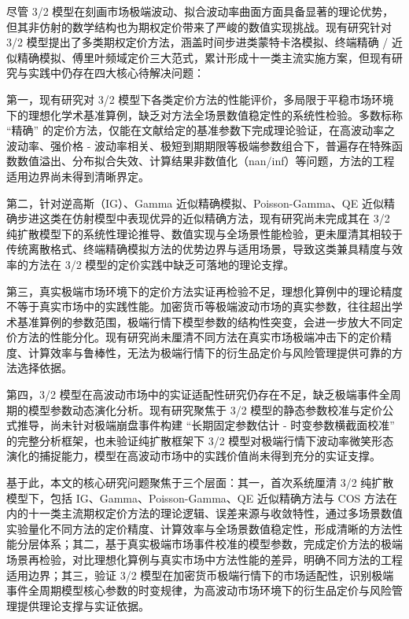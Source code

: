 尽管 3/2 模型在刻画市场极端波动、拟合波动率曲面方面具备显著的理论优势，但其非仿射的数学结构也为期权定价带来了严峻的数值实现挑战。现有研究针对 3/2 模型提出了多类期权定价方法，涵盖时间步进类蒙特卡洛模拟、终端精确 / 近似精确模拟、傅里叶频域定价三大范式，累计形成十一类主流实施方案，但现有研究与实践中仍存在四大核心待解决问题：

第一，现有研究对 3/2 模型下各类定价方法的性能评价，多局限于平稳市场环境下的理想化学术基准算例，缺乏对方法全场景数值稳定性的系统性检验。多数标称 “精确” 的定价方法，仅能在文献给定的基准参数下完成理论验证，在高波动率之波动率、强价格 - 波动率相关、极短到期期限等极端参数组合下，普遍存在特殊函数数值溢出、分布拟合失效、计算结果非数值化（nan/inf）等问题，方法的工程适用边界尚未得到清晰界定。

第二，针对逆高斯（IG）、Gamma 近似精确模拟、Poisson-Gamma、QE 近似精确步进这类在仿射模型中表现优异的近似精确方法，现有研究尚未完成其在 3/2 纯扩散模型下的系统性理论推导、数值实现与全场景性能检验，更未厘清其相较于传统离散格式、终端精确模拟方法的优势边界与适用场景，导致这类兼具精度与效率的方法在 3/2 模型的定价实践中缺乏可落地的理论支撑。

第三，真实极端市场环境下的定价方法实证再检验不足，理想化算例中的理论精度不等于真实市场中的实践性能。加密货币等极端波动市场的真实参数，往往超出学术基准算例的参数范围，极端行情下模型参数的结构性突变，会进一步放大不同定价方法的性能分化。现有研究尚未厘清不同方法在真实市场极端冲击下的定价精度、计算效率与鲁棒性，无法为极端行情下的衍生品定价与风险管理提供可靠的方法选择依据。

第四，3/2 模型在高波动市场中的实证适配性研究仍存在不足，缺乏极端事件全周期的模型参数动态演化分析。现有研究聚焦于 3/2 模型的静态参数校准与定价公式推导，尚未针对极端崩盘事件构建 “长期固定参数估计 - 时变参数横截面校准” 的完整分析框架，也未验证纯扩散框架下 3/2 模型对极端行情下波动率微笑形态演化的捕捉能力，模型在高波动市场中的实践价值尚未得到充分的实证支撑。

基于此，本文的核心研究问题聚焦于三个层面：其一，首次系统厘清 3/2 纯扩散模型下，包括 IG、Gamma、Poisson-Gamma、QE 近似精确方法与 COS 方法在内的十一类主流期权定价方法的理论逻辑、误差来源与收敛特性，通过多场景数值实验量化不同方法的定价精度、计算效率与全场景数值稳定性，形成清晰的方法性能分层体系；其二，基于真实极端市场事件校准的模型参数，完成定价方法的极端场景再检验，对比理想化算例与真实市场中方法性能的差异，明确不同方法的工程适用边界；其三，验证 3/2 模型在加密货币极端行情下的市场适配性，识别极端事件全周期模型核心参数的时变规律，为高波动市场环境下的衍生品定价与风险管理提供理论支撑与实证依据。

